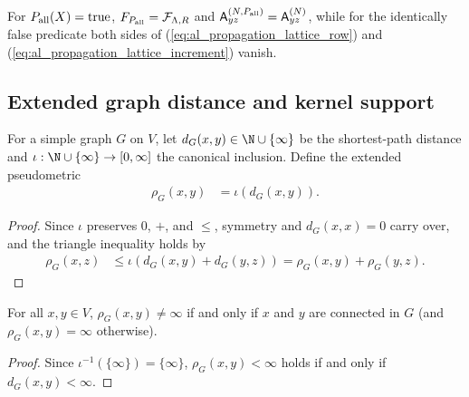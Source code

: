 For $P_{\rm all}(X)=\mathrm{true}$, $F_{P_{\rm all}}=\mathcal F_{\Lambda,R}$
and $\mathsf A^{(N,P_{\rm all})}_{yz}=\mathsf A^{(N)}_{yz}$, while for the
identically false predicate both sides of
(\ref{eq:al_propagation_lattice_row}) and
(\ref{eq:al_propagation_lattice_increment}) vanish.

\subsection{Extended graph distance and kernel support}

\begin{definition}
    \label{def:al_graph_extended_metric}
    \leanok
    For a simple graph $G$ on $V$, let $d_G(x,y)\in\N\cup\{\infty\}$ be the
    shortest-path distance and $\iota:\N\cup\{\infty\}\to[0,\infty]$ the
    canonical inclusion. Define the extended pseudometric
    \begin{align}
        \label{eq:al_propagation_extended_distance}
        \rho_G(x,y) & =\iota(d_G(x,y)).
    \end{align}
\end{definition}
\begin{proof}
    \leanok
    Since $\iota$ preserves $0$, $+$, and $\le$, symmetry and
    $d_G(x,x)=0$ carry over, and the triangle inequality holds by
    \begin{align}
        \label{eq:al_propagation_extended_triangle}
        \rho_G(x,z) & \le\iota(d_G(x,y)+d_G(y,z))
        =\rho_G(x,y)+\rho_G(y,z).
    \end{align}
\end{proof}

\begin{lemma}
    \label{thm:al_graph_extended_components}
    \leanok
    For all $x,y\in V$, $\rho_G(x,y)\ne\infty$ if and only if $x$ and $y$ are
    connected in $G$ (and $\rho_G(x,y)=\infty$ otherwise).
\end{lemma}
\begin{proof}
    \leanok
    Since $\iota^{-1}(\{\infty\})=\{\infty\}$, $\rho_G(x,y)<\infty$ holds if
    and only if $d_G(x,y)<\infty$.
\end{proof}

